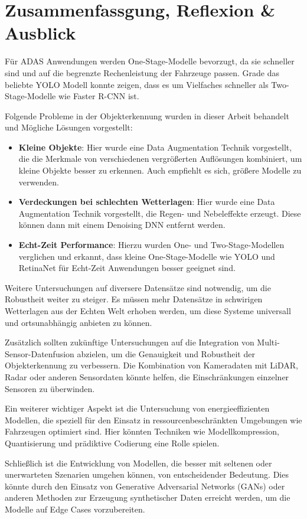 \section{Zusammenfassgung, Reflexion \& Ausblick} \label{sec:ausblick}

Für \ac{ADAS} Anwendungen werden One-Stage-Modelle bevorzugt, da sie schneller sind und auf die begrenzte Rechenleistung der Fahrzeuge passen. \cite{DeLasHeras2021AdvancedDA}
Grade das beliebte \ac{YOLO} Modell konnte zeigen, dass es um Vielfaches schneller als Two-Stage-Modelle wie Faster R-CNN ist. \cite{FasterRCNN} 

Folgende Probleme in der Objekterkennung wurden in dieser Arbeit behandelt und Mögliche Lösungen vorgestellt:
\begin{itemize}
    \item \textbf{Kleine Objekte}: Hier wurde eine Data Augmentation Technik vorgestellt, die die Merkmale von verschiedenen vergrößerten Auflösungen kombiniert, um kleine Objekte besser zu erkennen. Auch empfiehlt es sich, größere Modelle zu verwenden.
    
    \item \textbf{Verdeckungen bei schlechten Wetterlagen}: Hier wurde eine Data Augmentation Technik vorgestellt, die Regen- und Nebeleffekte erzeugt. Diese können dann mit einem Denoising \ac{DNN} entfernt werden.

    \item \textbf{Echt-Zeit Performance}: Hierzu wurden One- und Two-Stage-Modellen verglichen und erkannt, dass kleine One-Stage-Modelle wie \ac{YOLO} und RetinaNet für Echt-Zeit Anwendungen besser geeignet sind. 
\end{itemize}

Weitere Untersuchungen auf diversere Datensätze sind notwendig, um die Robustheit weiter zu steiger. Es müssen mehr Datensätze in schwirigen Wetterlagen aus der Echten Welt erhoben werden, um diese Systeme universall und ortsunabhängig anbieten zu können. 

Zusätzlich sollten zukünftige Untersuchungen auf die Integration von Multi-Sensor-Datenfusion abzielen, um die Genauigkeit und Robustheit der Objekterkennung zu verbessern. Die Kombination von Kameradaten mit LiDAR, Radar oder anderen Sensordaten könnte helfen, die Einschränkungen einzelner Sensoren zu überwinden.

Ein weiterer wichtiger Aspekt ist die Untersuchung von energieeffizienten Modellen, die speziell für den Einsatz in ressourcenbeschränkten Umgebungen wie Fahrzeugen optimiert sind. Hier könnten Techniken wie Modellkompression, Quantisierung und prädiktive Codierung eine Rolle spielen.

Schließlich ist die Entwicklung von Modellen, die besser mit seltenen oder unerwarteten Szenarien umgehen können, von entscheidender Bedeutung. Dies könnte durch den Einsatz von Generative Adversarial Networks (GANs) oder anderen Methoden zur Erzeugung synthetischer Daten erreicht werden, um die Modelle auf Edge Cases vorzubereiten.